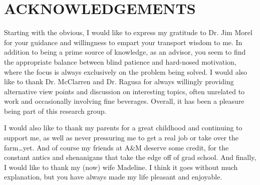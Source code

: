 %
%
%


\chapter*{ACKNOWLEDGEMENTS}

Starting with the obvious, I would like to express my gratitude to Dr. Jim Morel for your guidance and 
willingness to empart your transport wisdom to me.  In addition to being a prime source of
knowledge, as an advisor, you seem to find the appropriate balance between blind patience and hard-nosed
motivation, where the focus is always exclusively on the problem being solved. 
 I would also like to thank Dr. McClarren and Dr. Ragusa for always willingly providing
alternative view points and discussion on interesting topics, often unrelated to work and
occasionally involving fine beverages. Overall, it has been a pleasure being part of this research group. 

 I would also like to thank my parents for a great childhood and continuing to support me, as well
as never pressuring me to get a real job or take over the farm\ldots yet.  And of course my friends
at A\&M deserve some credit, for the constant antics and shenanigans that take the edge off of grad
school.  And finally, I would like to thank my (now) wife Madeline.  I think it goes without much
explanation, but you have always made my life pleasant and enjoyable.

\pagebreak{}
